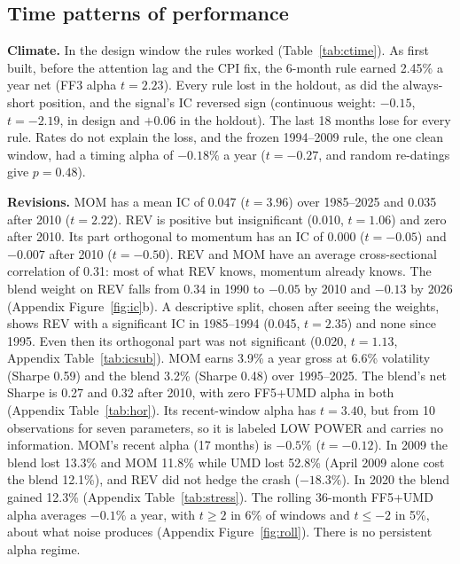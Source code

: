 \documentclass[11pt]{article}
\newcommand{\fit}[1]{\adjustbox{max width=\linewidth}{}}
\begin{document}
\subsection{Time patterns of performance}
\label{sec:time}

\begin{table}[h]
\centering\footnotesize
\caption{Climate strategy, corrected baseline. Each cell: annual net return / FF3 alpha (Newey--West, 6 lags, $t$), in \%. Recent window has 18 observations (low power).}
\label{tab:ctime}
\fit{tables/C2_time_patterns.tex}
\end{table}

\textbf{Climate.} In the design window the rules worked (Table~\ref{tab:ctime}). As first built, before the attention lag and the CPI fix, the 6-month rule earned 2.45\% a year net (FF3 alpha $t=2.23$). Every rule lost in the holdout, as did the always-short position, and the signal's IC reversed sign (continuous weight: $-0.15$, $t=-2.19$, in design and $+0.06$ in the holdout). The last 18 months lose for every rule. Rates do not explain the loss, and the frozen 1994--2009 rule, the one clean window, had a timing alpha of $-0.18\%$ a year ($t=-0.27$, and random re-datings give $p=0.48$).

\textbf{Revisions.} MOM has a mean IC of 0.047 ($t=3.96$) over 1985--2025 and 0.035 after 2010 ($t=2.22$). REV is positive but insignificant (0.010, $t=1.06$) and zero after 2010. Its part orthogonal to momentum has an IC of 0.000 ($t=-0.05$) and $-0.007$ after 2010 ($t=-0.50$). REV and MOM have an average cross-sectional correlation of 0.31: most of what REV knows, momentum already knows. The blend weight on REV falls from 0.34 in 1990 to $-0.05$ by 2010 and $-0.13$ by 2026 (Appendix Figure~\ref{fig:ic}b). A descriptive split, chosen after seeing the weights, shows REV with a significant IC in 1985--1994 (0.045, $t=2.35$) and none since 1995. Even then its orthogonal part was not significant (0.020, $t=1.13$, Appendix Table~\ref{tab:icsub}). MOM earns 3.9\% a year gross at 6.6\% volatility (Sharpe 0.59) and the blend 3.2\% (Sharpe 0.48) over 1995--2025. The blend's net Sharpe is 0.27 and 0.32 after 2010, with zero FF5+UMD alpha in both (Appendix Table~\ref{tab:hor}). Its recent-window alpha has $t=3.40$, but from 10 observations for seven parameters, so it is labeled LOW POWER and carries no information. MOM's recent alpha (17 months) is $-0.5\%$ ($t=-0.12$). In 2009 the blend lost 13.3\% and MOM 11.8\% while UMD lost 52.8\% (April 2009 alone cost the blend 12.1\%), and REV did not hedge the crash ($-18.3\%$). In 2020 the blend gained 12.3\% (Appendix Table~\ref{tab:stress}). The rolling 36-month FF5+UMD alpha averages $-0.1\%$ a year, with $t\geq 2$ in 6\% of windows and $t\leq-2$ in 5\%, about what noise produces (Appendix Figure~\ref{fig:roll}). There is no persistent alpha regime.
\end{document}
